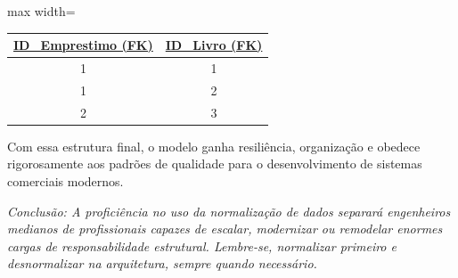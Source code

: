 \vspace{0.3cm}

\vspace{0.5cm}

\begin{adjustbox}{max width=\textwidth}
\begin{tabular}{|c|c|}
\hline
\textbf{\underline{ID\_Emprestimo (FK)}} & \textbf{\underline{ID\_Livro (FK)}} \\ \hline
1 & 1 \\ \hline
1 & 2 \\ \hline
2 & 3 \\ \hline
\end{tabular}
\end{adjustbox}

\vspace{0.3cm}

\vspace{0.4cm}

\justify

Com essa estrutura final, o modelo ganha resiliência, organização e obedece rigorosamente aos padrões de qualidade para o desenvolvimento de sistemas comerciais modernos.

\vspace{0.5cm}

\textit{Conclusão: A proficiência no uso da normalização de dados separará engenheiros medianos de profissionais capazes de escalar, modernizar ou remodelar enormes cargas de responsabilidade estrutural. Lembre-se, normalizar primeiro e desnormalizar na arquitetura, sempre quando necessário.}
